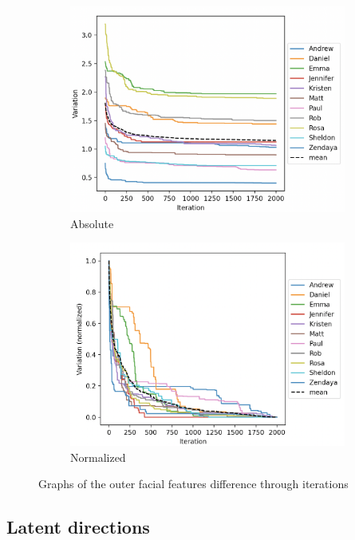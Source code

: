 \documentclass[review]{elsarticle}
\begin{document}
\begin{figure}[H]

\begin{subfigure}{0.49\textwidth}
\includegraphics[width=0.9\linewidth]{Images/absolute.png} 
\caption{Absolute}
\label{fig:absolute}
\end{subfigure}
\begin{subfigure}{0.49\textwidth}
\includegraphics[width=0.9\linewidth]{Images/normalized.png}
\caption{Normalized}
\label{fig:normalized}
\end{subfigure}

\caption{Graphs of the outer facial features difference through iterations}
\label{fig:variation_iterations}
\end{figure}

\subsection{Latent directions}
\end{document}

